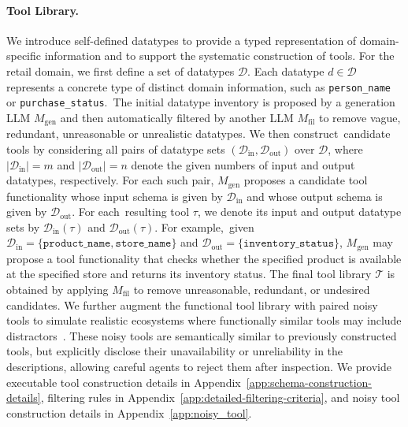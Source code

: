 \paragraph{Tool Library.}
We introduce self-defined datatypes to provide a typed representation of domain-specific information and to support the systematic construction of tools.
For the retail domain, we first define a set of datatypes $\mathcal{D}$.
Each datatype $d \in \mathcal{D}$ represents a concrete type of distinct domain information, such as \texttt{person\_name} or \texttt{purchase\_status}.~The initial datatype inventory is proposed by a generation LLM $M_{\mathrm{gen}}$ and then automatically filtered by another LLM $M_{\mathrm{fil}}$ to remove vague, redundant, unreasonable or unrealistic datatypes. We then construct~candidate tools by considering all pairs of datatype sets $(\mathcal{D}_{\mathrm{in}}, \mathcal{D}_{\mathrm{out}})$ over $\mathcal{D}$, where $|\mathcal{D}_{\mathrm{in}}|{=}m$ and $|\mathcal{D}_{\mathrm{out}}|{=}n$ denote the given numbers of input and output datatypes, respectively.
For each such pair, $M_{\mathrm{gen}}$ proposes a candidate tool functionality whose input schema is given by $\mathcal{D}_{\mathrm{in}}$ and whose output schema is given by $\mathcal{D}_{\mathrm{out}}$.
For each~resulting tool $\tau$, we denote its input and output datatype sets by $\mathcal{D}_{\mathrm{in}}(\tau)$ and $\mathcal{D}_{\mathrm{out}}(\tau)$.
For example,~given
$\mathcal{D}_{\mathrm{in}}{=}\{\texttt{product\_name}, \texttt{store\_name}\}$
and
$\mathcal{D}_{\mathrm{out}}{=}\{\texttt{inventory\_status}\}$,
$M_{\mathrm{gen}}$ may propose a tool functionality that checks whether the specified product is available at the specified store and returns its inventory status. 
The final tool library $\mathcal{T}$ is obtained by applying $M_{\mathrm{fil}}$ to remove unreasonable, redundant, or undesired candidates. 
We further augment the functional tool library with paired noisy tools to simulate realistic ecosystems where functionally similar tools may include distractors~\citep{huang2024metatoolbenchmarklargelanguage}. These noisy tools are semantically similar to previously constructed tools, but explicitly disclose their unavailability or unreliability in the descriptions, allowing careful agents to reject them after inspection.
We provide executable tool construction details in Appendix~\ref{app:schema-construction-details}, filtering rules in Appendix~\ref{app:detailed-filtering-criteria}, and noisy tool construction details in Appendix~\ref{app:noisy_tool}.

